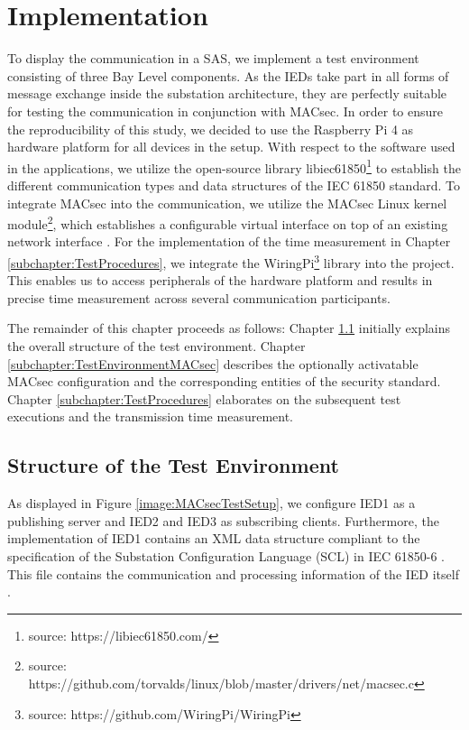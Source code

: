\documentclass[conference, onecolumn, a4paper]{IEEEtran}
\begin{document}
\section{Implementation}
\label{chapter:implementation}
\noindent To display the communication in a SAS, we implement a test environment consisting of three Bay Level components. As the IEDs take part 
in all forms of message exchange inside the substation architecture, they are perfectly suitable for testing the communication in conjunction with MACsec. 
In order to ensure the reproducibility of this study, we decided to use the Raspberry Pi 4 as hardware platform for all devices in the setup. With respect 
to the software used in the applications, we utilize the open-source library libiec61850\footnote{source: https://libiec61850.com/} to establish the 
different communication types and data structures of the IEC 61850 standard. To integrate MACsec into the communication, we utilize the MACsec Linux kernel 
module\footnote{source: https://github.com/torvalds/linux/blob/master/drivers/net/macsec.c}, which establishes a configurable virtual interface on top of 
an existing network interface \cite{MACsecLinuxModuleDoc:2016}. For the implementation of the time measurement in Chapter \ref{subchapter:TestProcedures},  
we integrate the WiringPi\footnote{source: https://github.com/WiringPi/WiringPi} library into the project. This enables us to access peripherals of the 
hardware platform and results in precise time measurement across several communication participants. 

\smallskip 
The remainder of this chapter proceeds as follows: Chapter \ref{subchapter:TestEnvironmentStructure} initially explains the overall structure of the 
test environment. Chapter \ref{subchapter:TestEnvironmentMACsec} describes the optionally activatable MACsec configuration and the corresponding entities 
of the security standard. Chapter \ref{subchapter:TestProcedures} elaborates on the subsequent test executions and the transmission time measurement. 

\subsection{Structure of the Test Environment}
\label{subchapter:TestEnvironmentStructure}
\noindent As displayed in Figure \ref{image:MACsecTestSetup}, we configure IED1 as a publishing server and IED2 and IED3 as subscribing clients. 
Furthermore, the implementation of IED1 contains an XML data structure compliant to the specification of the Substation Configuration Language (SCL) 
in IEC 61850-6 \cite{IEC61850-6:2010}. This file contains the communication and processing information of the IED itself \cite{IEC61850_Overview:2006}.
\end{document}

